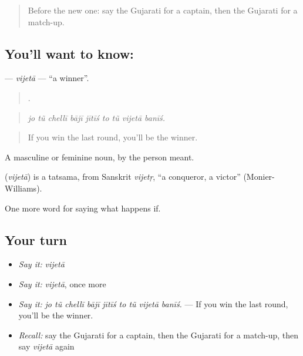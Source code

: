 \label{lesson:GU-C548-vijeta}



\begin{quote}
Before the new one: say the Gujarati for a captain, then the Gujarati for a match-up.
\end{quote}

\subsection*{You'll want to know: }
\textbf{} — \emph{vijetā} — \textquotedblleft{}a winner\textquotedblright{}.

\begin{quote}
        .
\end{quote}

\begin{quote}
\emph{jo tũ chellī bājī jītīś to tũ vijetā banīś.}
\end{quote}

\begin{quote}
If you win the last round, you'll be the winner.
\end{quote}

A masculine or feminine noun, by the person meant.

\begin{cousinweb}
\textbf{} (\emph{vijetā}) is a tatsama, from Sanskrit \emph{vijetṛ}, \textquotedblleft{}a conqueror, a victor\textquotedblright{} (Monier-Williams).
\end{cousinweb}

\begin{grammarlens}[title={What you've built}]
One more word for saying what happens if.
\end{grammarlens}

\subsection*{Your turn}
\begin{itemize}
\raggedright
  \item \emph{Say it:} \emph{vijetā}
  \item \emph{Say it:} \emph{vijetā}, once more
  \item \emph{Say it:} \emph{jo tũ chellī bājī jītīś to tũ vijetā banīś.} — If you win the last round, you'll be the winner.
  \item \emph{Recall:} say the Gujarati for a captain, then the Gujarati for a match-up, then say \emph{vijetā} again
\end{itemize}

